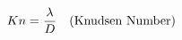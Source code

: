 \documentclass[preview]{standalone}
\begin{document}
\begin{align*}
\special{dvisvgm:raw <g id='unique000'>}Kn = \frac{\lambda}{D} \quad \text{(Knudsen Number)}\special{dvisvgm:raw </g>}
\end{align*}
\end{document}
